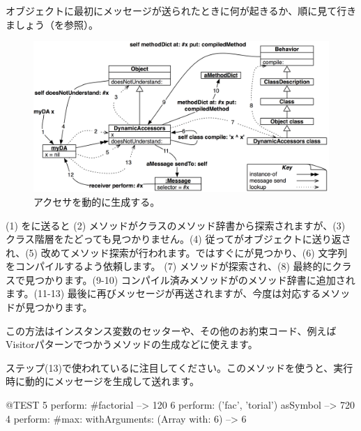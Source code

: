 \documentclass[a4paper,10pt,twoside]{book}
\begin{document}
オブジェクトに最初にメッセージが送られたときに何が起きるか、順に見て行きましょう（を参照）。

\begin{figure}[ht]\centering
	\includegraphics[width=\linewidth]{DynamicAccessors}
	\caption{アクセサを動的に生成する。}
\end{figure}

(1) をに送ると (2) メソッドがクラスのメソッド辞書から探索されますが、(3) クラス階層をたどっても見つかりません。(4) 従ってがオブジェクトに送り返され、(5) 改めてメソッド探索が行われます。ではすぐにが見つかり、(6) 文字列をコンパイルするよう依頼します。 (7) メソッドが探索され、(8) 最終的にクラスで見つかります。(9-10) コンパイル済みメソッドがのメソッド辞書に追加されます。(11-13) 最後に再びメッセージが再送されますが、今度は対応するメソッドが見つかります。

この方法はインスタンス変数のセッターや、その他のお約束コード、例えばVisitorパターンでつかうメソッドの生成などに使えます。

ステップ(13)で使われているに注目してください。このメソッドを使うと、実行時に動的にメッセージを生成して送れます。
\begin{code}{@TEST}
5 perform: #factorial                                             --> 120
6 perform: ('fac', 'torial') asSymbol                       --> 720
4 perform: #max: withArguments: (Array with: 6) --> 6
\end{code}
\end{document}
